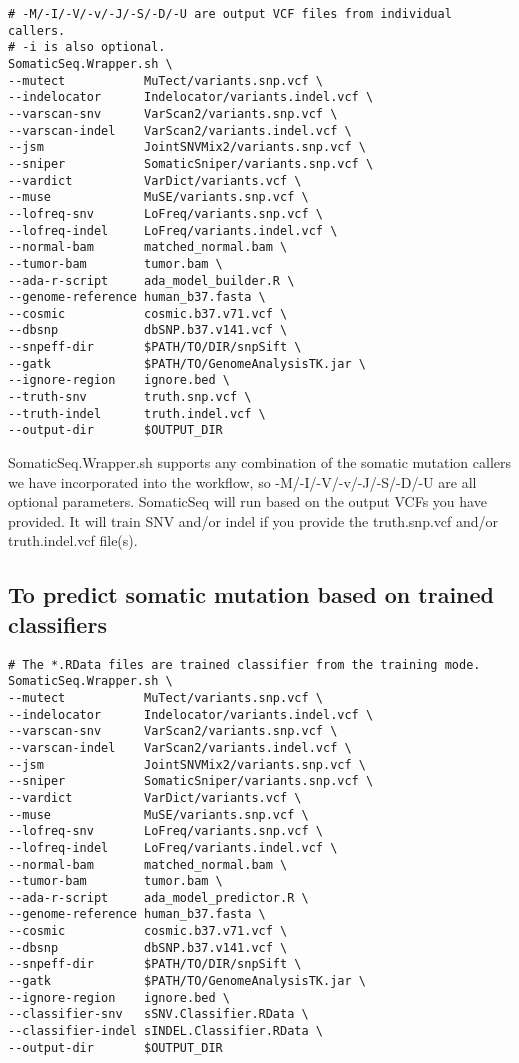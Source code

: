 \documentclass[10pt,letterpaper]{article}
\begin{document}
\begin{sloppypar}
\begin{lstlisting}
# -M/-I/-V/-v/-J/-S/-D/-U are output VCF files from individual callers.
# -i is also optional.
SomaticSeq.Wrapper.sh \
--mutect           MuTect/variants.snp.vcf \
--indelocator      Indelocator/variants.indel.vcf \
--varscan-snv      VarScan2/variants.snp.vcf \
--varscan-indel    VarScan2/variants.indel.vcf \
--jsm              JointSNVMix2/variants.snp.vcf \
--sniper           SomaticSniper/variants.snp.vcf \
--vardict          VarDict/variants.vcf \
--muse             MuSE/variants.snp.vcf \
--lofreq-snv       LoFreq/variants.snp.vcf \
--lofreq-indel     LoFreq/variants.indel.vcf \
--normal-bam       matched_normal.bam \
--tumor-bam        tumor.bam \
--ada-r-script     ada_model_builder.R \
--genome-reference human_b37.fasta \
--cosmic           cosmic.b37.v71.vcf \
--dbsnp            dbSNP.b37.v141.vcf \
--snpeff-dir       $PATH/TO/DIR/snpSift \
--gatk             $PATH/TO/GenomeAnalysisTK.jar \
--ignore-region    ignore.bed \
--truth-snv        truth.snp.vcf \
--truth-indel      truth.indel.vcf \
--output-dir       $OUTPUT_DIR
\end{lstlisting}

SomaticSeq.Wrapper.sh supports any combination of the somatic mutation callers we have incorporated into the workflow, so -M/-I/-V/-v/-J/-S/-D/-U are all optional parameters. SomaticSeq will run based on the output VCFs you have provided. It will train SNV and/or indel if you provide the truth.snp.vcf and/or truth.indel.vcf file(s).




\subsection{To predict somatic mutation based on trained classifiers}

\begin{lstlisting}
# The *.RData files are trained classifier from the training mode.
SomaticSeq.Wrapper.sh \
--mutect           MuTect/variants.snp.vcf \
--indelocator      Indelocator/variants.indel.vcf \
--varscan-snv      VarScan2/variants.snp.vcf \
--varscan-indel    VarScan2/variants.indel.vcf \
--jsm              JointSNVMix2/variants.snp.vcf \
--sniper           SomaticSniper/variants.snp.vcf \
--vardict          VarDict/variants.vcf \
--muse             MuSE/variants.snp.vcf \
--lofreq-snv       LoFreq/variants.snp.vcf \
--lofreq-indel     LoFreq/variants.indel.vcf \
--normal-bam       matched_normal.bam \
--tumor-bam        tumor.bam \
--ada-r-script     ada_model_predictor.R \
--genome-reference human_b37.fasta \
--cosmic           cosmic.b37.v71.vcf \
--dbsnp            dbSNP.b37.v141.vcf \
--snpeff-dir       $PATH/TO/DIR/snpSift \
--gatk             $PATH/TO/GenomeAnalysisTK.jar \
--ignore-region    ignore.bed \
--classifier-snv   sSNV.Classifier.RData \
--classifier-indel sINDEL.Classifier.RData \
--output-dir       $OUTPUT_DIR


\end{lstlisting}
\end{sloppypar}
\end{document}
